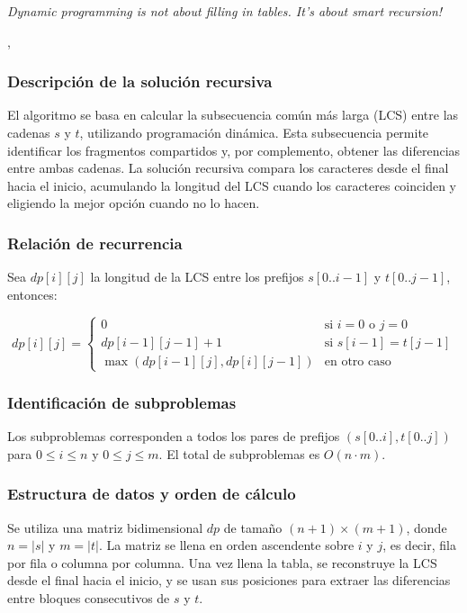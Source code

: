 
\epigraph{\textit{Dynamic programming is not about filling in tables. It's about smart recursion!}}{\citeauthor{algorithms_erickson}, \citeyear{algorithms_erickson} \cite{algorithms_erickson}}

\subsubsection{Descripción de la solución recursiva}

El algoritmo se basa en calcular la subsecuencia común más larga (LCS) entre las cadenas $s$ y $t$, utilizando programación dinámica. Esta subsecuencia permite identificar los fragmentos compartidos y, por complemento, obtener las diferencias entre ambas cadenas. La solución recursiva compara los caracteres desde el final hacia el inicio, acumulando la longitud del LCS cuando los caracteres coinciden y eligiendo la mejor opción cuando no lo hacen.

\subsubsection{Relación de recurrencia}

Sea $dp[i][j]$ la longitud de la LCS entre los prefijos $s[0..i-1]$ y $t[0..j-1]$, entonces:

\[
dp[i][j] =
\begin{cases}
0 & \text{si } i = 0 \text{ o } j = 0 \\
dp[i-1][j-1] + 1 & \text{si } s[i-1] = t[j-1] \\
\max(dp[i-1][j], dp[i][j-1]) & \text{en otro caso}
\end{cases}
\]

\subsubsection{Identificación de subproblemas}

Los subproblemas corresponden a todos los pares de prefijos $(s[0..i], t[0..j])$ para $0 \leq i \leq n$ y $0 \leq j \leq m$. El total de subproblemas es $O(n \cdot m)$.

\subsubsection{Estructura de datos y orden de cálculo}

Se utiliza una matriz bidimensional $dp$ de tamaño $(n+1) \times (m+1)$, donde $n = |s|$ y $m = |t|$. La matriz se llena en orden ascendente sobre $i$ y $j$, es decir, fila por fila o columna por columna. Una vez llena la tabla, se reconstruye la LCS desde el final hacia el inicio, y se usan sus posiciones para extraer las diferencias entre bloques consecutivos de $s$ y $t$.

